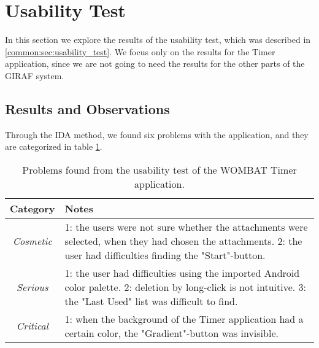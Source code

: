\section{Usability Test}
\label{sec:usability_results}

In this section we explore the results of the usability test, which was described in \autoref{common:sec:usability_test}. We focus only on the results for the Timer application, since we are not going to need the results for the other parts of the GIRAF system.

\subsection{Results and Observations}
Through the IDA method, we found six problems with the application, and they are categorized in table \ref{IDA_table}.

\begin{table}[width=\textwidth]
		\begin{center}
			\begin{tabular}{|c|p{10cm}|}
				\hline
				\textbf{Category} & \textbf{Notes} \\
				\hline
				\textit{Cosmetic} & 1: the users were not sure whether the attachments were selected, when they had chosen the attachments. 2: the user had difficulties finding the "Start"-button. \\
				\hline
				\textit{Serious} & 1: the user had difficulties using the imported Android color palette. 2: deletion by long-click is not intuitive. 3: the "Last Used" list was difficult to find. \\
				\hline
				\textit{Critical} & 1: when the background of the Timer application had a certain color, the "Gradient"-button was invisible. \\
				\hline
			\end{tabular}
			\caption{Problems found from the usability test of the WOMBAT Timer application.}
			\label{IDA_table}
		\end{center}
	\end{table}